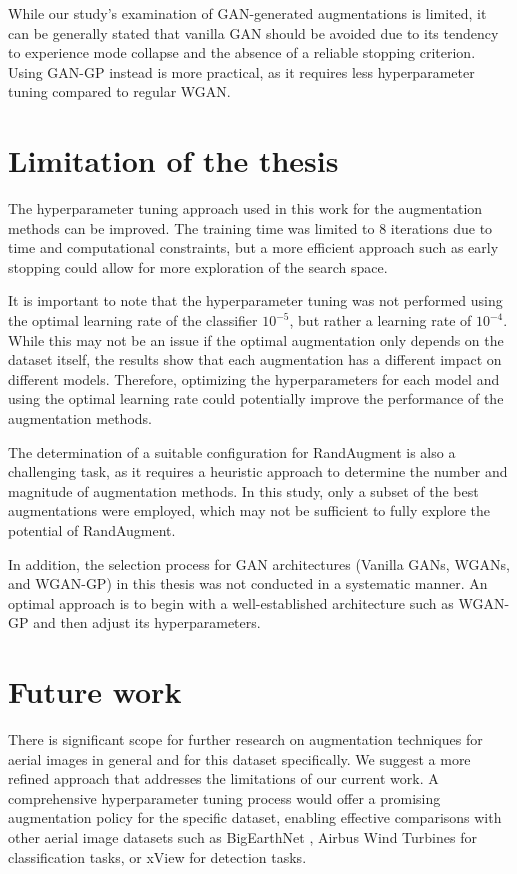 While our study's examination of GAN-generated augmentations is limited, it can be generally stated that vanilla GAN should be avoided due to its tendency to experience mode collapse and the absence of a reliable stopping criterion. Using GAN-GP instead is more practical, as it requires less hyperparameter tuning compared to regular WGAN.

\section{Limitation of the thesis}
The hyperparameter tuning approach used in this work for the augmentation methods can be improved. The training time was limited to 8 iterations due to time and computational constraints, but a more efficient approach such as  early stopping could allow for more exploration of the search space. 

It is important to note that the hyperparameter tuning was not performed using the optimal learning rate of the classifier $10^{-5}$, but rather a learning rate of $10^{-4}$. While this may not be an issue if the optimal augmentation only depends on the dataset itself, the results show that each augmentation has a different impact on different models. Therefore, optimizing the hyperparameters for each model and using the optimal learning rate could potentially improve the performance of the augmentation methods.

The determination of a suitable configuration for RandAugment is also a challenging task, as it requires a heuristic approach to determine the number and magnitude of augmentation methods. In this study, only a subset of the best augmentations were employed, which may not be sufficient to fully explore the potential of RandAugment.

In addition, the selection process for GAN architectures (Vanilla GANs, WGANs, and WGAN-GP) in this thesis was not conducted in a systematic manner. An optimal approach is to begin with a well-established architecture such as WGAN-GP and then adjust its hyperparameters.

\section{Future work}
There is significant scope for further research on augmentation techniques for aerial images in general and for this dataset specifically. We suggest a more refined approach that addresses the limitations of our current work. A comprehensive hyperparameter tuning process would offer a promising augmentation policy for the specific dataset, enabling effective comparisons with other aerial image datasets such as BigEarthNet \cite{sumbul2019bigearthnet}, Airbus Wind Turbines \cite{windmilldataset} for classification tasks, or xView \cite{xview2018} for detection tasks.

